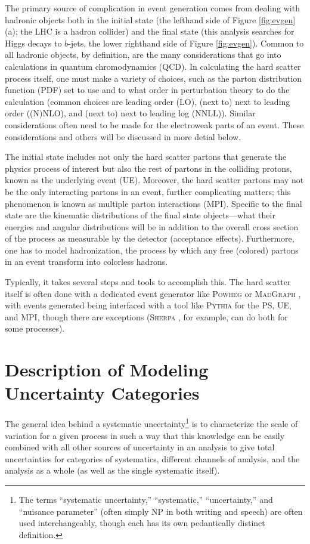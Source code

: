 The primary source of complication in event generation comes from dealing with hadronic objects both in the initial state (the lefthand side of Figure \ref{fig:evgen} (a); the LHC is a hadron collider) and the final state (this analysis searches for Higgs decays to $b$-jets, the lower righthand side of Figure \ref{fig:evgen}).  Common to all hadronic objects, by definition, are the many considerations that go into calculations in quantum chromodynamics (QCD).  In calculating the hard scatter process itself, one must make a variety of choices, such as the parton distribution function (PDF) set to use and to what order in perturbation theory to do the calculation (common choices are leading order (LO), (next to) next to leading order ((N)NLO), and (next to) next to leading log (NNLL)).  Similar considerations often need to be made for the electroweak parts of an event.  These considerations and others will be discussed in more detial below.  

The initial state includes not only the hard scatter partons that generate the physics process of interest but also the rest of partons in the colliding protons, known as the underlying event (UE).  Moreover, the hard scatter partons may not be the only interacting partons in an event, further complicating matters; this phenomenon is known as multiple parton interactions (MPI).  Specific to the final state are the kinematic distributions of the final state objects---what their energies and angular distributions will be in addition to the overall cross section of the process as measurable by the detector (acceptance effects).  Furthermore, one has to model hadronization, the process by which any free (colored) partons in an event transform into colorless hadrons.

Typically, it takes several steps and tools to accomplish this.  The hard scatter itself is often done with a dedicated event generator like \textsc{Powheg} \cite{powheg0} or \textsc{MadGraph} \cite{madgraph}, with events generated being interfaced with a tool like \textsc{Pythia} \cite{pythia8} for the PS, UE, and MPI, though there are exceptions (\textsc{Sherpa} \cite{sherpa}, for example, can do both for some processes).

\section{Description of Modeling Uncertainty Categories}
\label{sec:modsysgen}
The general idea behind a systematic uncertainty\footnote{The terms ``systematic uncertainty,'' ``systematic,'' ``uncertainty,'' and ``nuisance parameter'' (often simply NP in both writing and speech) are often used interchangeably, though each has its own pedantically distinct definition.}  is to characterize the scale of variation for a given process in such a way that this knowledge can be easily combined with all other sources of uncertainty in an analysis to give total uncertainties for categories of systematics, different channels of analysis, and the analysis as a whole (as well as the single systematic itself).

